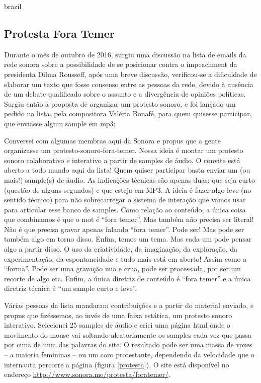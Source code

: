 \begin{otherlanguage*}{brazil}
\subsection{Protesta Fora Temer}
Durante o mês de outubro de 2016, surgiu uma discussão na lista de emails da rede sonora sobre a possibilidade de se posicionar contra o impeachment da presidenta Dilma Rousseff, após uma breve discussão, verificou-se a dificuldade de elaborar um texto que fosse consenso entre as pessoas da rede, devido à ausência de um debate qualificado sobre o assunto e a divergência de opiniões políticas. 
Surgiu então a proposta de organizar um protesto sonoro, e foi lançado um pedido na lista, pela compositora Valéria Bonafé, para quem quisesse participar, que enviasse algum sample em mp3: 
\begin{citacao}
Conversei com algumas membras aqui da Sonora e propus que a gente organizasse um protesto-sonoro-fora-temer. Nossa ideia é montar um protesto sonoro colaborativo e interativo a partir de samples de áudio. O convite está aberto a todo mundo aqui da lista! Quem quiser participar basta enviar um (ou mais!) sample(s) de áudio. As indicações técnicas são apenas duas: que seja curto (questão de alguns segundos) e que esteja em MP3. A ideia é fazer algo leve (no sentido técnico) para não sobrecarregar o sistema de interação que vamos usar para articular esse banco de samples. Como relação ao conteúdo, a única coisa que combinamos é que o mot é “fora temer”. Mas também não precisa ser literal! Não é que precisa gravar apenas falando “fora temer”. Pode ser! Mas pode ser também algo em torno disso. Enfim, temos um tema. Mas cada um pode pensar algo a partir disso. O uso da criatividade, da imaginação, da exploração, da experimentação, da espontaneidade e tudo mais está em aberto! Assim como a “forma”. Pode ser uma gravação nua e crua, pode ser processada, por ser um recorte de algo etc. Enfim, a única diretriz de conteúdo é “fora temer” e a única diretriz técnica é “um sample curto e leve”.
\end{citacao}
Várias pessoas da lista mandaram contribuições e a partir do material enviado, e propus que fizéssemos, ao invés de uma faixa estática, um protesto sonoro interativo. Selecionei 25 samples de áudio e criei uma página html onde o movimento do mouse vai soltando aleatoriamente os samples cada vez que passa por cima de uma das palavras do site. O resultado pode ser uma massa de vozes – a maioria femininas – ou um coro protestante, dependendo da velocidade que o internauta percorre a página (figura \ref{protesta}). O site está disponível no endereço \url{http://www.sonora.me/protesta/foratemer/}. 


\end{otherlanguage*}
